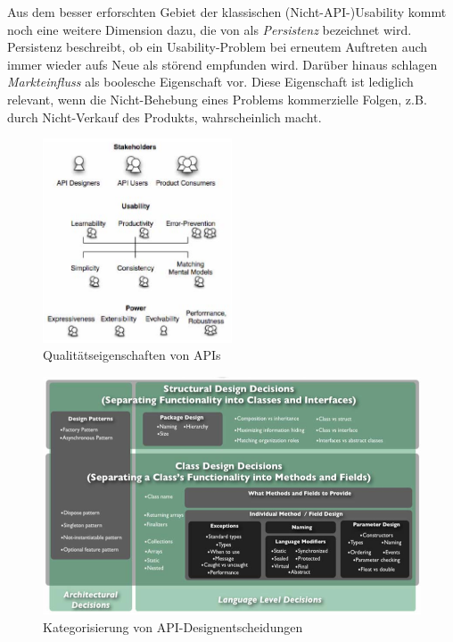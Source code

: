 \begin{important}
Aus dem besser erforschten Gebiet der klassischen (Nicht-API-)Usability kommt noch eine weitere Dimension dazu, die von \cite{Nielsen:1994tx} als \emph{Persistenz} bezeichnet wird. Persistenz beschreibt, ob ein Usability-Problem bei erneutem Auftreten auch immer wieder aufs Neue als störend empfunden wird. Darüber hinaus schlagen \cite{Sarodnick:2006vc} \emph{Markteinfluss} als boolesche Eigenschaft vor. Diese Eigenschaft ist lediglich relevant, wenn die Nicht-Behebung eines Problems kommerzielle Folgen, z.B. durch Nicht-Verkauf des Produkts, wahrscheinlich macht.
\end{important}

\begin{figure}
  \centering
    \includegraphics[width=0.5\textwidth]{Figures/APIQualityHierarchy.png}
  \caption{Qualitätseigenschaften von APIs \citep{Stylos:2007ip}}
  \label{fig:APIQualityHierarchy}
\end{figure}

\begin{figure}
  \centering
    \includegraphics[width=1.0\textwidth]{Figures/APIDesignDecisions.png}
  \caption{Kategorisierung von API-Designentscheidungen \citep{Stylos:2007ip}}
  \label{fig:APIDesignDecisions}
\end{figure}






